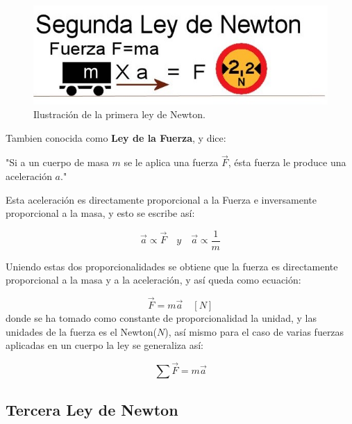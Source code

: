 \documentclass[a5paper,pagesize,10pt,bibtotoc,pointlessnumbers,
normalheadings,DIV=9,fleqn,x11names,table,twoside=false]{scrbook}
\begin{document}
\begin{figure}[ht]
 \centering
 \includegraphics[scale=0.5]{images/segunda-ley-de-newton.jpg}
 \caption{Ilustración de la primera ley de Newton.}\label{ac}
\end{figure} 

Tambien conocida como \textbf{Ley de la Fuerza}, y dice:

\begin{tcolorbox}
"Si a un cuerpo de masa $m$ se le aplica una fuerza $\vec{F}$, ésta fuerza le produce una aceleración $a$."
\end{tcolorbox}

Esta aceleración es directamente proporcional a la Fuerza e inversamente proporcional a la masa, y esto se escribe así:

\begin{equation}
\vec{a} \propto \vec{F} \quad y \quad \vec{a} \propto \frac{1}{m}
\end{equation}

Uniendo estas dos proporcionalidades se obtiene que la fuerza es directamente proporcional a la masa y a la aceleración, y así 
queda como ecuación:

\begin{equation}
\vec{F} = m\vec{a} \quad [N]
\end{equation}
donde se ha tomado como constante de proporcionalidad la unidad, y las unidades de la fuerza es el Newton($N$), así mismo para el 
caso de varias fuerzas aplicadas en un cuerpo la ley se generaliza así:

\begin{equation}
\sum \vec{F} = m\vec{a}
\end{equation} 

\subsection{Tercera Ley de Newton}
\end{document}
